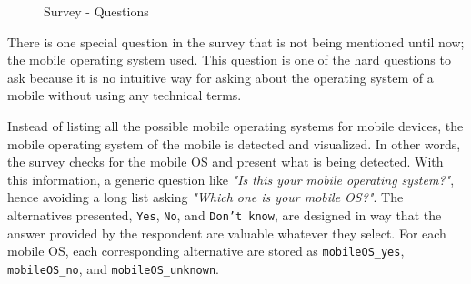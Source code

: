 \begin{figure}[H]
{      }
      \caption{Survey - Questions}
      \label{fig:surveyquestoins}
    \end{figure}

    \clearpage

    There is one special question in the survey that is not being mentioned until now; the mobile operating system used. This question is one of the hard questions to ask because it is no intuitive way for asking about the operating system of a mobile without using any technical terms. 

    Instead of listing all the possible mobile operating systems for mobile devices, the mobile operating system of the mobile is detected and visualized. In other words, the survey checks for the mobile OS and present what is being detected. With this information, a generic question like {\it "Is this your mobile operating system?"}, hence avoiding a long list asking {\it "Which one is your mobile OS?"}. The alternatives presented, \texttt{Yes}, \texttt{No}, and \texttt{Don't know}, are designed in way that the answer provided by the respondent are valuable whatever they select. For each mobile OS, each corresponding alternative are stored as \texttt{mobileOS\_yes}, \texttt{mobileOS\_no}, and \texttt{mobileOS\_unknown}.

